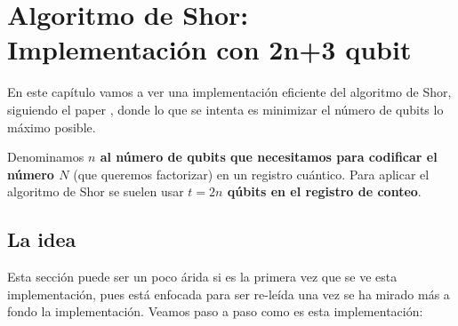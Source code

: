 \documentclass[a4paper,11pt]{book} %
\numberwithin{equation}{chapter}
\begin{document}
\chapter{Algoritmo de Shor: Implementación con 2n+3 qubit}

En este capítulo vamos a ver una implementación eficiente del algoritmo de Shor, siguiendo el paper \cite{bib_2n+3}, donde lo que se intenta es minimizar el número de qubits lo máximo posible. 

Denominamos \textbf{$n$ al número de qubits que necesitamos para codificar el número $N$} (que queremos factorizar) en un registro cuántico. Para aplicar el algoritmo de Shor se suelen usar \textbf{$t=2n$ qúbits en el registro de conteo}.

\section{La idea} \label{sec_2n+3-La-idea}

Esta sección puede ser un poco árida si es la primera vez que se ve esta implementación, pues está enfocada para ser re-leída una vez se ha mirado más a fondo la implementación. Veamos paso a paso como es esta implementación:
\end{document}
